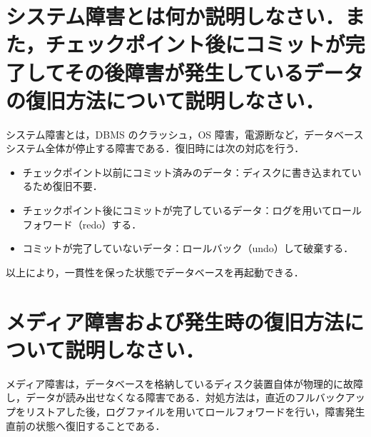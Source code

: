 \documentclass[titlepage,a4paper]{jsarticle}
\begin{document}
\section{システム障害とは何か説明しなさい．また，チェックポイント後にコミットが完了してその後障害が発生しているデータの復旧方法について説明しなさい． }
システム障害とは，DBMS のクラッシュ，OS 障害，電源断など，データベースシステム全体が停止する障害である．復旧時には次の対応を行う．
\begin{itemize}
  \item チェックポイント以前にコミット済みのデータ：ディスクに書き込まれているため復旧不要．
  \item チェックポイント後にコミットが完了しているデータ：ログを用いてロールフォワード（redo）する．
  \item コミットが完了していないデータ：ロールバック（undo）して破棄する．
\end{itemize}
以上により，一貫性を保った状態でデータベースを再起動できる．

\section{メディア障害および発生時の復旧方法について説明しなさい．}
メディア障害は，データベースを格納しているディスク装置自体が物理的に故障し，データが読み出せなくなる障害である．対処方法は，直近のフルバックアップをリストアした後，ログファイルを用いてロールフォワードを行い，障害発生直前の状態へ復旧することである．
\end{document}
